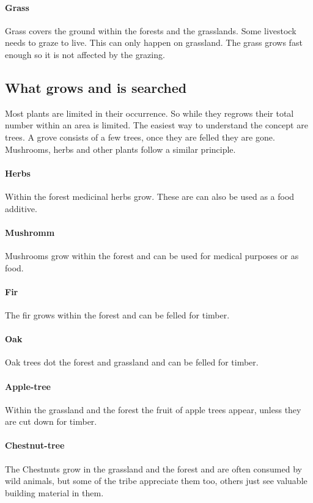 \paragraph{Grass}
Grass covers the ground within the forests and the grasslands. Some livestock
needs to graze to live. This can only happen on grassland. The grass grows fast
enough so it is not affected by the grazing.

\subsection{What grows and is searched}\label{ch:Goods:Nature:Plants:Limited}
Most plants are limited in their occurrence.
So while they regrows their total number within an area is limited.
The easiest way to understand the concept are trees.
A grove consists of a few trees, once they are felled they are gone.
Mushrooms, herbs and other plants follow a similar principle.

\paragraph{Herbs}
Within the forest medicinal herbs grow. These are can also be used as a food
additive.

\paragraph{Mushromm}
Mushrooms grow within the forest and can be used for medical purposes or as
food.

\paragraph{Fir}
The fir grows within the forest and can be felled for timber.

\paragraph{Oak}
Oak trees dot the forest and grassland and can be felled for timber.

\paragraph{Apple-tree}
Within the grassland and the forest the fruit of apple trees appear, unless
they are cut down for timber.

\paragraph{Chestnut-tree}
The Chestnuts grow in the grassland and the forest and are often consumed by
wild animals, but some of the tribe appreciate them too, others just see
valuable building material in them.

